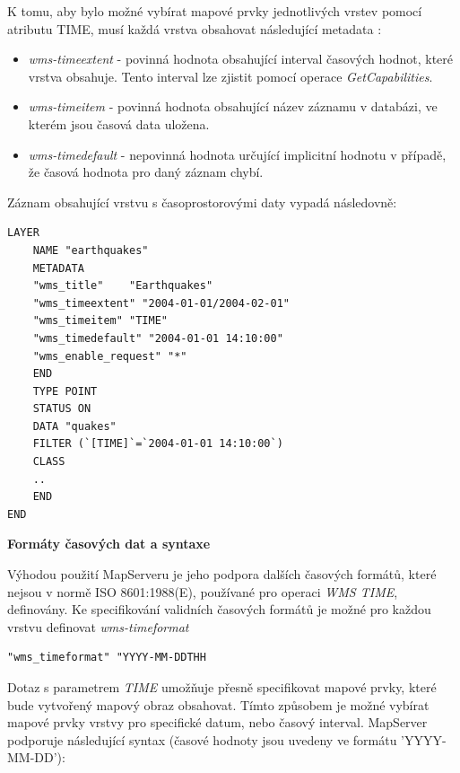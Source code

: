K tomu, aby bylo možné vybírat mapové prvky jednotlivých vrstev pomocí atributu
TIME, musí každá vrstva obsahovat následující metadata
\cite{mapserver_about}:

\begin{itemize}
\item\textit{wms-timeextent} - povinná hodnota obsahující interval
  časových hodnot, které vrstva obsahuje. Tento interval lze zjistit
  pomocí operace \textit{GetCapabilities}.
\item\textit{wms-timeitem} - povinná hodnota obsahující název záznamu
  v databázi, ve kterém jsou časová data uložena.
\item\textit{wms-timedefault} - nepovinná hodnota určující implicitní
  hodnotu v případě, že časová hodnota pro daný záznam chybí.
\end{itemize}

\noindent
Záznam obsahující vrstvu s časoprostorovými daty vypadá následovně:

\begin{verbatim}
LAYER
	NAME "earthquakes"
	METADATA
	"wms_title"    "Earthquakes"
	"wms_timeextent" "2004-01-01/2004-02-01"
	"wms_timeitem" "TIME"
	"wms_timedefault" "2004-01-01 14:10:00"
	"wms_enable_request" "*"
	END
	TYPE POINT
	STATUS ON
	DATA "quakes"
	FILTER (`[TIME]`=`2004-01-01 14:10:00`)
	CLASS
	..
	END
END
\end{verbatim}

\bigskip
\noindent
\textbf{Formáty časových dat a syntaxe}

Výhodou použití MapServeru je jeho podpora dalších časových formátů,
které nejsou v normě ISO 8601:1988(E), používané pro operaci
\textit{WMS TIME}, definovány. Ke specifikování validních časových
formátů je možné pro každou vrstvu definovat \textit{wms-timeformat}

\begin{verbatim}
"wms_timeformat" "YYYY-MM-DDTHH
\end{verbatim}

Dotaz s parametrem \textit{TIME} umožňuje přesně specifikovat
mapové prvky, které bude vytvořený mapový obraz obsahovat. Tímto způsobem je možné vybírat mapové prvky vrstvy pro specifické datum, nebo časový interval. MapServer
podporuje následující syntax (časové hodnoty jsou uvedeny ve formátu
'YYYY-MM-DD'):

